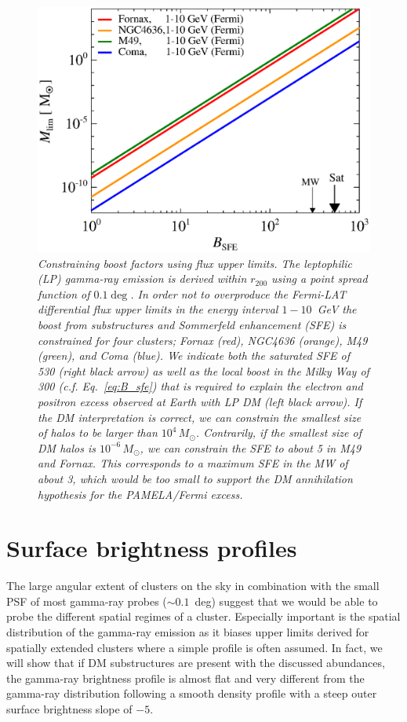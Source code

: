 \documentclass[10pt,aps,pra,reprint,amsmath,amsfonts,amssymb,showpacs,nofootinbib,floatfix]{revtex4-1}
\newcommand{\Fermi}{{\em Fermi}\xspace}
\newcommand{\msun}{M_\odot}
\newcommand{\rvir}{r_{200}}
\begin{document}
\begin{figure}%
 \includegraphics[width=0.99\columnwidth]{figures/LP.const.diff.v14.0.1deg.1.6T.SubMass.SF700.IR2.noMW.woGal.eps}
 \caption{\it Constraining boost factors using flux upper limits. The
   leptophilic (LP) gamma-ray emission is derived within $\rvir$ using
   a point spread function of $0.1\deg$. In order not to overproduce
   the \Fermi-LAT differential flux upper limits in the energy
   interval $1-10$~GeV the boost from substructures and Sommerfeld
   enhancement (SFE) is constrained for four clusters; Fornax (red),
   NGC4636 (orange), M49 (green), and Coma (blue). We indicate both
   the saturated SFE of 530 (right black arrow) as well as the local
   boost in the Milky Way of 300 (c.f. Eq.~\ref{eq:B_sfe}) that is
   required to explain the electron and positron excess observed at
   Earth with LP DM (left black arrow). If the DM interpretation is
   correct, we can constrain the smallest size of halos to be larger
   than $10^4\,\msun$. Contrarily, if the smallest size of DM halos is
   $10^{-6}\,\msun$, we can constrain the SFE to about 5 in M49 and
   Fornax. This corresponds to a maximum SFE in the MW of about 3,
   which would be too small to support the DM annihilation hypothesis
   for the PAMELA/\Fermi excess.}
 \label{fig:boost_const}
\end{figure}


\section{Surface brightness profiles}
\label{sect:spatial}

The large angular extent of clusters on the sky in combination with
the small PSF of most gamma-ray probes ($\sim 0.1$~deg) suggest that
we would be able to probe the different spatial regimes of a
cluster. Especially important is the spatial distribution of the
gamma-ray emission as it biases upper limits derived for spatially
extended clusters where a simple profile is often assumed. In fact, we
will show that if DM substructures are present with the discussed
abundances, the gamma-ray brightness profile is almost flat and very
different from the gamma-ray distribution following a smooth density
profile with a steep outer surface brightness slope of $-5$.
\end{document}
